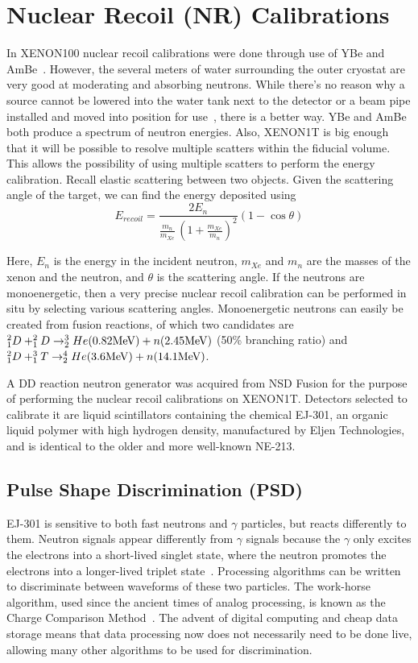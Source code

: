 

\chapter{Nuclear Recoil (NR) Calibrations}

In XENON100 nuclear recoil calibrations were done through use of YBe and AmBe~\cite{}. However, the several meters of water surrounding the outer cryostat are very good at moderating and absorbing neutrons. While there's no reason why a source cannot be lowered into the water tank next to the detector or a beam pipe installed and moved into position for use~\cite{LUX}, there is a better way. YBe and AmBe both produce a spectrum of neutron energies. Also, XENON1T is big enough that it will be possible to resolve multiple scatters within the fiducial volume. This allows the possibility of using multiple scatters to perform the energy calibration. Recall elastic scattering between two objects. Given the scattering angle of the target, we can find the energy deposited using
\begin{equation}
E_{recoil} = \frac{2 E_n}{\frac{m_n}{m_{Xe}}\,(1+\frac{m_{Xe}}{m_n})^2}(1-\cos \theta)
\end{equation}

Here, $E_n$ is the energy in the incident neutron, $m_{Xe}$ and $m_n$ are the masses of the xenon and the neutron, and $\theta$ is the scattering angle. If the neutrons are monoenergetic, then a very precise nuclear recoil calibration can be performed in situ by selecting various scattering angles. Monoenergetic neutrons can easily be created from fusion reactions, of which two candidates are $^2_1D + ^2_1D \rightarrow ^3_2He (0.82 \mathrm{MeV}) + n (2.45\mathrm{MeV})$ (50\% branching ratio) and $^2_1D + ^3_1T \rightarrow ^4_2He (3.6\mathrm{MeV}) + n (14.1\mathrm{MeV})$.

A DD reaction neutron generator was acquired from NSD Fusion for the purpose of performing the nuclear recoil calibrations on XENON1T. Detectors selected to calibrate it are liquid scintillators containing the chemical EJ-301, an organic liquid polymer with high hydrogen density, manufactured by Eljen Technologies, and is identical to the older and more well-known NE-213.

\section{Pulse Shape Discrimination (PSD)}

EJ-301 is sensitive to both fast neutrons and $\gamma$ particles, but reacts differently to them. Neutron signals appear differently from $\gamma$ signals because the $\gamma$ only excites the electrons into a short-lived singlet state, where the neutron promotes the electrons into a longer-lived triplet state~\cite{}. Processing algorithms can be written to discriminate between waveforms of these two particles. The work-horse algorithm, used since the ancient times of analog processing, is known as the Charge Comparison Method~\cite{}. The advent of digital computing and cheap data storage means that data processing now does not necessarily need to be done live, allowing many other algorithms to be used for discrimination.


